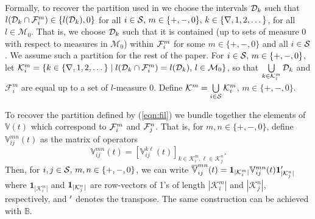 Formally, to recover the partition used in \citep{bo2014} we choose the intervals \(\mathcal{D}_k\) such that \(   l (\mathcal{D}_k\cap\mathcal{F}_i^m) \in \{   l (\mathcal{D}_k), 0\}\) for all \(i\in\mathcal{S},\,m\in\{+,-,0\},\,k\in\{\nabla,1,2,\dots\}\), for all \( l \in\mathcal M_0\). That is, we choose \(\mathcal{D}_k\) such that it is contained (up to sets of measure 0 with respect to measures in \(\mathcal M_0\)) within \(\mathcal{F}_i^m\) for some \(m\in\{+,-,0\}\) and all \(i\in\mathcal{S}\). We assume such a partition for the rest of the paper. For \(i\in\mathcal{S},\,m\in\{+,-,0\}\), let \(\mathcal K^m_i = \{k\in\{\nabla,1,2,\dots\}\mid  l (\mathcal{D}_k\cap\mathcal{F}_i^m) =   l (\mathcal{D}_k),\,l\in\mathcal M_0 \}\), so that \(\bigcup\limits_{k\in\mathcal K_i^m} \mathcal{D}_k\) and \(\mathcal F_i^m\) are equal up to a set of \(l\)-measure 0. Define \(\mathcal K^m = \bigcup\limits_{i\in\mathcal{S}}\mathcal K_i^m\), \(m\in\{+,-,0\}\). 

To recover the partition defined by (\ref{eqn:fil}) we bundle together the elements of \(\mathbb V(t)\) which correspond to \(\mathcal{F}_i^m\) and \(\mathcal{F}_j^n\). That is, for \(m,n\in\{+,-,0\}\), define \(\mathbb V_{ij}^{m n}(t)\) as the matrix of operators 
\[\mathbb V_{ij}^{m n}(t) = \left[\mathbb V_{ij}^{k \ell}(t)\right]_{k\in\mathcal K_i^m,\ell\in\mathcal K_j^n}.\] 
Then, for \(i,j\in\mathcal{S},\,m,n\in\{+,-,0\}\), we can write \(\overline{\mathbb  V}_{ij}^{mn}(t) = \boldsymbol 1_{|\mathcal K_i^m|} \mathbb V_{ij}^{m n}(t) \boldsymbol 1_{|\mathcal K_j^n|}'{}\) where \(\boldsymbol 1_{|\mathcal K_i^m|}\) and \(\boldsymbol 1_{|\mathcal K_j^n|}\) are row-vectors of 1's of length \(|\mathcal K_i^m|\) and \(|\mathcal K_j^n|\), respectively, and \({}'{}\) denotes the transpose. The same construction can be achieved with \(\mathbb B\). 

